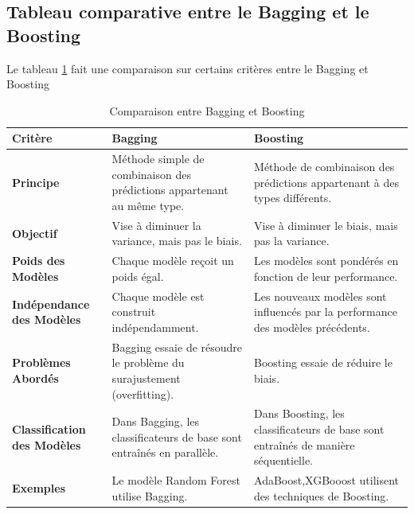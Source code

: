 \subsection{Tableau comparative entre le Bagging et le Boosting}
Le tableau \ref{tab:bagging_vs_boosting} fait une comparaison sur certains critères entre le Bagging et Boosting
\begin{table}[h!]
	\centering
	\caption{Comparaison entre Bagging et Boosting}
	\begin{tabular}{|p{}|p{}|p{}|}
		\hline
		\textbf{Critère} & \textbf{Bagging} & \textbf{Boosting} \\
		\hline
		\textbf{Principe} & Méthode simple de combinaison des prédictions appartenant au même type. & Méthode de combinaison des prédictions appartenant à des types différents. \\
		\hline
		\textbf{Objectif} & Vise à diminuer la variance, mais pas le biais. & Vise à diminuer le biais, mais pas la variance. \\
		\hline
		\textbf{Poids des Modèles} & Chaque modèle reçoit un poids égal. & Les modèles sont pondérés en fonction de leur performance. \\
		\hline
		\textbf{Indépendance des Modèles} & Chaque modèle est construit indépendamment. & Les nouveaux modèles sont influencés par la performance des modèles précédents. \\
		\hline
		\textbf{Problèmes Abordés} & Bagging essaie de résoudre le problème du surajustement (overfitting). & Boosting essaie de réduire le biais. \\
		\hline
		\textbf{Classification des Modèles} & Dans Bagging, les classificateurs de base sont entraînés en parallèle. & Dans Boosting, les classificateurs de base sont entraînés de manière séquentielle. \\
		\hline
		\textbf{Exemples} & Le modèle Random Forest utilise Bagging. & AdaBoost,XGBooost utilisent des techniques de Boosting. \\
		\hline
	\end{tabular}
	\label{tab:bagging_vs_boosting}
\end{table}
